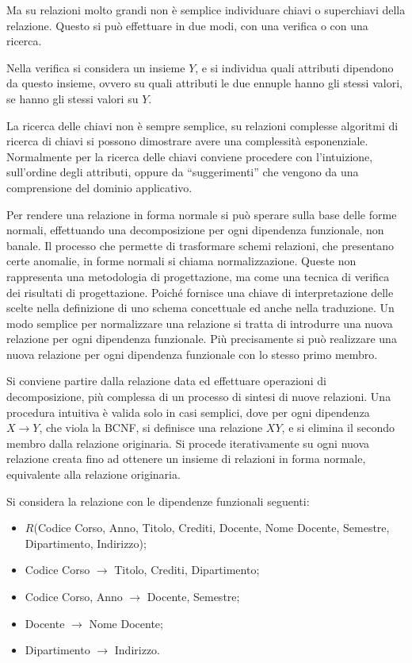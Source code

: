 \documentclass{article}
\numberwithin{equation}{subsection}
\begin{document}
Ma su relazioni molto grandi non è semplice individuare chiavi o superchiavi della relazione. Questo si può effettuare in due modi, con una verifica o con una ricerca. 

Nella verifica si considera un insieme $Y$, e si individua quali attributi dipendono da questo insieme, ovvero su quali attributi le due ennuple hanno gli stessi valori, 
se hanno gli stessi valori su $Y$. 

La ricerca delle chiavi non è sempre semplice, su relazioni complesse algoritmi di ricerca di chiavi si possono dimostrare avere una complessità esponenziale. 
Normalmente per la ricerca delle chiavi conviene procedere con l'intuizione, sull'ordine degli attributi, oppure da ``suggerimenti'' che vengono da 
una comprensione del dominio applicativo. 

Per rendere una relazione in forma normale si può sperare sulla base delle forme normali, effettuando una decomposizione per ogni dipendenza funzionale, non 
banale. Il processo che permette di trasformare schemi relazioni, che presentano certe anomalie, in forme normali si chiama normalizzazione. Queste non rappresenta 
una metodologia di progettazione, ma come una tecnica di verifica dei risultati di progettazione. Poiché fornisce una chiave di interpretazione delle scelte nella 
definizione di uno schema concettuale ed anche nella traduzione. 
Un modo semplice per normalizzare una relazione si tratta di introdurre una nuova relazione per ogni dipendenza funzionale. Più precisamente si può realizzare una nuova 
relazione per ogni dipendenza funzionale con lo stesso primo membro. 

Si conviene partire dalla relazione data ed effettuare operazioni di decomposizione, più complessa di un processo di sintesi di nuove relazioni. 
Una procedura intuitiva è valida solo in casi semplici, dove per ogni dipendenza $X\to Y$, che viola la BCNF, si definisce una relazione $XY$, e si elimina il secondo membro  
dalla relazione originaria. Si procede iterativamente su ogni nuova relazione creata fino ad ottenere un insieme di relazioni in forma normale, equivalente alla 
relazione originaria. 

Si considera la relazione con le dipendenze funzionali seguenti:
\begin{itemize}
    \item $R$(Codice Corso, Anno, Titolo, Crediti, Docente, Nome Docente, Semestre, Dipartimento, Indirizzo);
    \item Codice Corso $\to$ Titolo, Crediti, Dipartimento;
    \item Codice Corso, Anno $\to$ Docente, Semestre;
    \item Docente $\to$ Nome Docente;
    \item Dipartimento $\to$ Indirizzo. 
\end{itemize}
\end{document}
